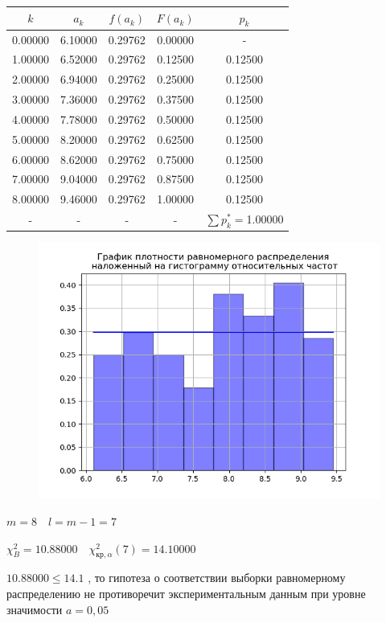 \begin{tabular}{|c|c|c|c|c|}%
\hline%
$k$&$a_k$&$f(a_k)$&$F(a_k)$&$p_k$\\%
\hline%
0.00000&6.10000&0.29762&0.00000&{-}\\%
\hline%
1.00000&6.52000&0.29762&0.12500&0.12500\\%
\hline%
2.00000&6.94000&0.29762&0.25000&0.12500\\%
\hline%
3.00000&7.36000&0.29762&0.37500&0.12500\\%
\hline%
4.00000&7.78000&0.29762&0.50000&0.12500\\%
\hline%
5.00000&8.20000&0.29762&0.62500&0.12500\\%
\hline%
6.00000&8.62000&0.29762&0.75000&0.12500\\%
\hline%
7.00000&9.04000&0.29762&0.87500&0.12500\\%
\hline%
8.00000&9.46000&0.29762&1.00000&0.12500\\%
\hline%
{-}&{-}&{-}&{-}&$\sum p_{k}^*=$1.00000\\%
\hline%
\end{tabular}%
\newline%
\newline%
%


\begin{figure}%
\centering%
\includegraphics[width=1.0\textwidth]{../latex/inc/generated/img/relFreqDensity4.png}%
\end{figure}

%
$m=8 \quad l=m-1=7$

%
$\chi_{B}^2 = 10.88000 \quad \chi^2_{\text{кр}, \alpha}(7) = 14.10000$

%
$10.88000 \le 14.1$%
, то гипотеза о соответствии выборки равномерному распределению не противоречит экспериментальным данным при уровне значимости $a=0,05$